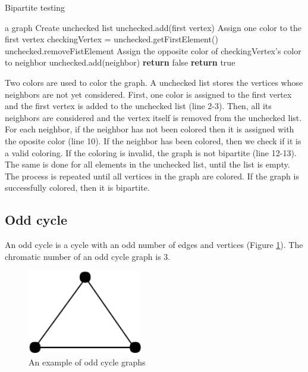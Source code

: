 \documentclass[a4paper]{report}
\begin{document}
			\begin{algorithm}
				\caption{Bipartite testing}
				\label{alg:bipartite}
			
				\begin{algorithmic}[1]
					\REQUIRE a graph
					\STATE Create unchecked list
					\STATE unchecked.add(first vertex)
					\STATE Assign one color to the first vertex
					\STATE checkingVertex = unchecked.getFirstElement()
					\STATE unchecked.removeFistElement
					\STATE Assign the opposite color of checkingVertex's color to neighbor
					\STATE unchecked.add(neighbor)
					\STATE \textbf{return} false
					\ENDIF
					\ENDFOR
					\ENDWHILE
					\ENDWHILE
					\STATE \textbf{return} true
				\end{algorithmic}
			\end{algorithm}
			 Two colors are used to color the graph. A unchecked list stores the vertices whose neighbors are not yet considered. First, one color is assigned to the first vertex and the first vertex is added to the unchecked list (line 2-3). Then, all its neighbors are considered and the vertex itself is removed from the unchecked list. For each neighbor, if the neighbor has not been colored then it is assigned with the oposite color (line 10). If the neighbor has been colored, then we check if it is a valid coloring. If the coloring is invalid, the graph is not bipartite (line 12-13). The same is done for all elements in the unchecked list, until the list is empty. The process is repeated until all vertices in the graph are colored. If the graph is successfully colored, then it is bipartite.
			\subsection{Odd cycle}
			An odd cycle is a cycle with an odd number of edges and vertices (Figure \ref{fig:oddcycle}). The chromatic number of an odd cycle graph is 3. \\
			
			\begin{figure}[h]
				\centering
				\includegraphics[width=50mm,scale=0.5]{figures/cycle.pdf}
				\caption{An example of odd cycle graphs}
				\label{fig:oddcycle}
			\end{figure}
		
\end{document}
